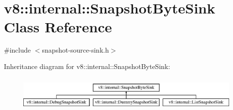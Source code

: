 \hypertarget{classv8_1_1internal_1_1_snapshot_byte_sink}{}\section{v8\+:\+:internal\+:\+:Snapshot\+Byte\+Sink Class Reference}
\label{classv8_1_1internal_1_1_snapshot_byte_sink}


{\ttfamily \#include $<$snapshot-\/source-\/sink.\+h$>$}

Inheritance diagram for v8\+:\+:internal\+:\+:Snapshot\+Byte\+Sink\+:\begin{figure}[H]
\begin{center}
\leavevmode
\includegraphics[height=1.821138cm]{classv8_1_1internal_1_1_snapshot_byte_sink}
\end{center}
\end{figure}
